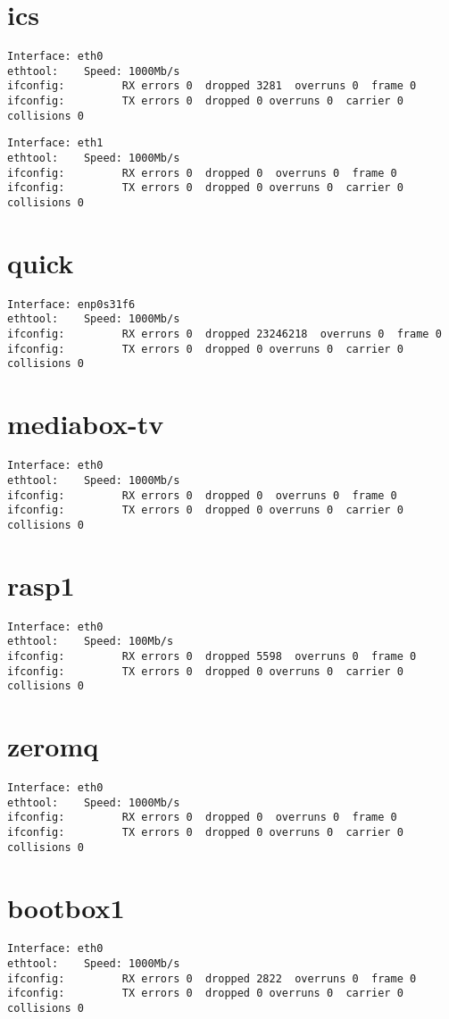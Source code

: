 \documentclass{article}
\begin{document}
\section{ics}
\begin{verbatim}
Interface: eth0
ethtool: 	Speed: 1000Mb/s
ifconfig:         RX errors 0  dropped 3281  overruns 0  frame 0
ifconfig:         TX errors 0  dropped 0 overruns 0  carrier 0  collisions 0
\end{verbatim}

\begin{verbatim}
Interface: eth1
ethtool: 	Speed: 1000Mb/s
ifconfig:         RX errors 0  dropped 0  overruns 0  frame 0
ifconfig:         TX errors 0  dropped 0 overruns 0  carrier 0  collisions 0
\end{verbatim}

\section{quick}
\begin{verbatim}
Interface: enp0s31f6
ethtool: 	Speed: 1000Mb/s
ifconfig:         RX errors 0  dropped 23246218  overruns 0  frame 0
ifconfig:         TX errors 0  dropped 0 overruns 0  carrier 0  collisions 0
\end{verbatim}

\section{mediabox-tv}
\begin{verbatim}
Interface: eth0
ethtool: 	Speed: 1000Mb/s
ifconfig:         RX errors 0  dropped 0  overruns 0  frame 0
ifconfig:         TX errors 0  dropped 0 overruns 0  carrier 0  collisions 0
\end{verbatim}

\section{rasp1}
\begin{verbatim}
Interface: eth0
ethtool: 	Speed: 100Mb/s
ifconfig:         RX errors 0  dropped 5598  overruns 0  frame 0
ifconfig:         TX errors 0  dropped 0 overruns 0  carrier 0  collisions 0
\end{verbatim}

\section{zeromq}
\begin{verbatim}
Interface: eth0
ethtool: 	Speed: 1000Mb/s
ifconfig:         RX errors 0  dropped 0  overruns 0  frame 0
ifconfig:         TX errors 0  dropped 0 overruns 0  carrier 0  collisions 0
\end{verbatim}

\section{bootbox1}
\begin{verbatim}
Interface: eth0
ethtool: 	Speed: 1000Mb/s
ifconfig:         RX errors 0  dropped 2822  overruns 0  frame 0
ifconfig:         TX errors 0  dropped 0 overruns 0  carrier 0  collisions 0
\end{verbatim}
\end{document}
